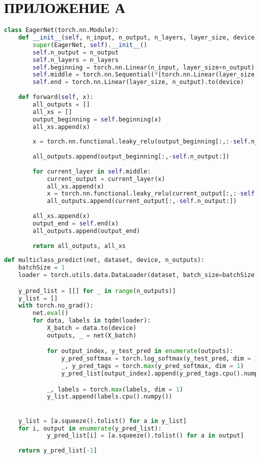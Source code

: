 
\chapter*{ПРИЛОЖЕНИЕ А}

\begin{lstlisting}[label=code:model, language=python, caption={Модель нейронной сети}]
    class EagerNet(torch.nn.Module):
    def __init__(self, n_input, n_output, n_layers, layer_size, device):
        super(EagerNet, self).__init__()
        self.n_output = n_output
        self.n_layers = n_layers 
        self.beginning = torch.nn.Linear(n_input, layer_size+n_output).to(device)
        self.middle = torch.nn.Sequential(*[torch.nn.Linear(layer_size, layer_size+n_output).to(device) for _ in range(n_layers)])
        self.end = torch.nn.Linear(layer_size, n_output).to(device) 
    
    def forward(self, x):
        all_outputs = []
        all_xs = []
        output_beginning = self.beginning(x) 
        all_xs.append(x)
    
        x = torch.nn.functional.leaky_relu(output_beginning[:,:-self.n_output])
    
        all_outputs.append(output_beginning[:,-self.n_output:])
    
        for current_layer in self.middle:
            current_output = current_layer(x)
            all_xs.append(x)
            x = torch.nn.functional.leaky_relu(current_output[:,:-self.n_output])
            all_outputs.append(current_output[:,-self.n_output:])
    
        all_xs.append(x)
        output_end = self.end(x)
        all_outputs.append(output_end)
    
        return all_outputs, all_xs
\end{lstlisting}


\begin{lstlisting}[label=code:model, language=python, caption={Функция классификации}]
def multiclass_predict(net, dataset, device, n_outputs):
    batchSize = 1
    loader = torch.utils.data.DataLoader(dataset, batch_size=batchSize, shuffle=False)

    y_pred_list = [[] for _ in range(n_outputs)]
    y_list = []
    with torch.no_grad():
        net.eval()
        for data, labels in tqdm(loader):			
            X_batch = data.to(device)
            outputs, _ = net(X_batch)

            for output_index, y_test_pred in enumerate(outputs):
                y_pred_softmax = torch.log_softmax(y_test_pred, dim = 1)
                _, y_pred_tags = torch.max(y_pred_softmax, dim = 1)
                y_pred_list[output_index].append(y_pred_tags.cpu().numpy())

            _, labels = torch.max(labels, dim = 1)
            y_list.append(labels.cpu().numpy())


    y_list = [a.squeeze().tolist() for a in y_list]
    for i, output in enumerate(y_pred_list):
            y_pred_list[i] = [a.squeeze().tolist() for a in output]
    
    return y_pred_list[-1]
\end{lstlisting}